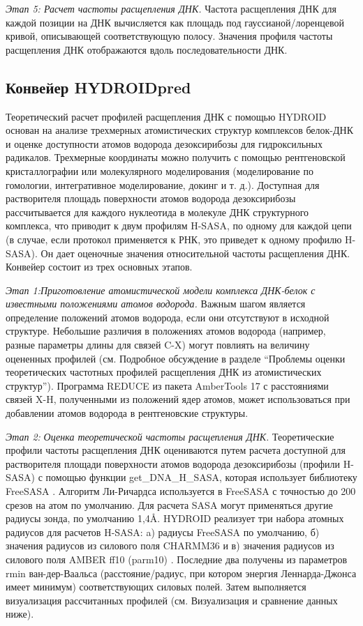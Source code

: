     \emph{Этап 5: Расчет частоты расщепления ДНК.} Частота расщепления ДНК для каждой позиции на ДНК вычисляется как площадь под гауссианой/лоренцевой кривой, описывающей соответствующую полосу. Значения профиля частоты расщепления ДНК отображаются вдоль последовательности ДНК.
    
    \subsection{Конвейер HYDROIDpred}
     Теоретический расчет профилей расщепления ДНК с помощью HYDROID основан на анализе трехмерных атомистических структур комплексов белок-ДНК и оценке доступности атомов водорода дезоксирибозы для гидроксильных радикалов. Трехмерные координаты можно получить с помощью рентгеновской кристаллографии или молекулярного моделирования (моделирование по гомологии, интегративное моделирование, докинг и т. д.). Доступная для растворителя площадь поверхности атомов водорода дезоксирибозы рассчитывается для каждого нуклеотида в молекуле ДНК структурного комплекса, что приводит к двум профилям H-SASA, по одному для каждой цепи (в случае, если протокол применяется к РНК, это приведет к одному профилю H-SASA). Он дает оценочные значения относительной частоты расщепления ДНК. Конвейер состоит из трех основных этапов.
    
    \textit{\emph{Этап 1:}Приготовление атомистической модели комплекса ДНК-белок с известными положениями атомов водорода.} Важным шагом является определение положений атомов водорода, если они отсутствуют в исходной структуре. Небольшие различия в положениях атомов водорода (например, разные параметры длины для связей C-X) могут повлиять на величину оцененных профилей (см. Подробное обсуждение в разделе ``Проблемы оценки теоретических частотных профилей расщепления ДНК из атомистических структур''). Программа REDUCE \cite{word_asparagine_1999} из пакета AmberTools 17 \cite{case_amber_nodate} с расстояниями связей X-H, полученными из  положений ядер атомов, может использоваться при добавлении атомов водорода в рентгеновские структуры.
    
    \emph{Этап 2:} \textit{Оценка теоретической частоты расщепления ДНК.} Теоретические профили частоты расщепления ДНК оцениваются путем расчета доступной для растворителя площади поверхности атомов водорода дезоксирибозы (профили H-SASA) с помощью функции get\_DNA\_H\_SASA, которая использует библиотеку FreeSASA \cite{mitternacht_freesasa_2016}. Алгоритм Ли-Ричардса используется \cite{lee_interpretation_1971} в FreeSASA с точностью до 200 срезов на атом по умолчанию. Для расчета SASA могут применяться другие радиусы зонда, по умолчанию 1,4\AA. HYDROID реализует три набора атомных радиусов для расчетов H-SASA: a) радиусы FreeSASA по умолчанию, б) значения радиусов из силового поля CHARMM36 \cite{best_optimization_2012} и в) значения радиусов из силового поля AMBER ff10 (parm10) \cite{case_amber_nodate}. Последние два получены из параметров rmin ван-дер-Ваальса (расстояние/радиус, при котором энергия Леннарда-Джонса имеет минимум) соответствующих силовых полей. Затем выполняется визуализация рассчитанных профилей (см. Визуализация и сравнение данных ниже).
    

